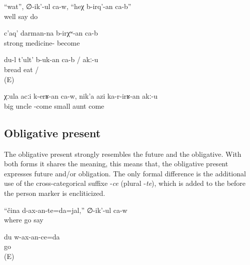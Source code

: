 \begin{exe}
	\ex	\label{ex:Well, he says, this needs to be done}
	\gll	``wat'',	∅-ik'-ul	ca-w,	``heχ	b-irq'-an	ca-b''	\\
		well	say			do	\\
	\glt	{}


	\ex	\label{ex:It must be a strong medicine}
	\gll	c'aq'	darman-na	b-irχʷ-an	ca-b\\
		strong		medicine-	become	\\
	\glt	{}


	\ex	\label{ex:I have / do not have to eat bread}
	\gll	du-l t'ult' b-uk-an	ca-b	/	akː-u\\
			bread	eat	 /	\\
	\glt	{} (E)
	
	\ex	\label{ex:The elder uncle has to go; the younger aunt should not go}
	\gll	χːula	acːi	k-erʁ-an	ca-w,	nik'a	azi	ka-r-irʁ-an	akː-u\\
		big	uncle	-come		small	aunt	come	\\
	\glt	{}
\end{exe}



\subsection{Obligative present}
\label{ssec:Obligative present}

The obligative present strongly resembles the future and the obligative. With both forms it shares the meaning, this means that, the obligative present expresses future and/or obligation. The only formal difference is the additional use of the cross-categorical suffixe -\textit{ce} (plural -\textit{te}), which is added to the  before the person marker is encliticized.

\begin{exe}
	\ex	\label{ex:‎Where will you (pl) go he says}
	\gll	``čina	d-ax-an-te=da=jal,''	∅-ik'-ul	ca-w	\\
		where	go	say		\\
	\glt	{}

	\ex	\label{ex:I will go / have to go analytic}
	\gll	du	w-ax-an-ce=da\\
			go\\
	\glt	{} (E)
\end{exe}

